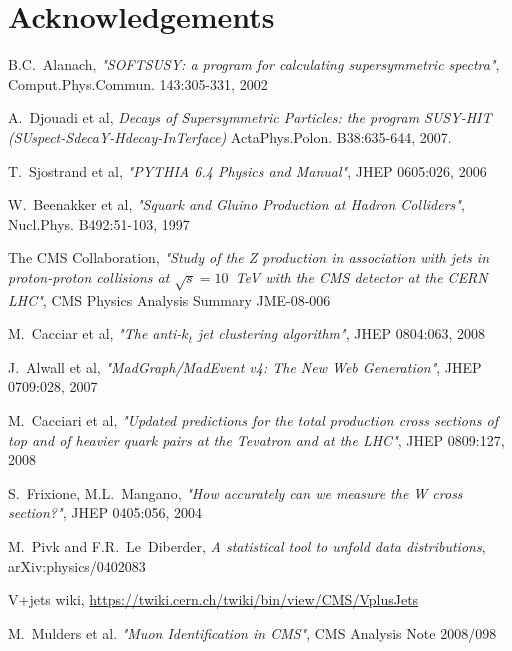 \documentclass{cmspaper}
\begin{document}
\section{Acknowledgements}

\begin{thebibliography}{9}
     B.C.~Alanach, {\em "SOFTSUSY: a program for calculating supersymmetric spectra"}, Comput.Phys.Commun. 143:305-331, 2002
    
     A.~Djouadi et al, {\em Decays of Supersymmetric Particles: the program SUSY-HIT (SUspect-SdecaY-Hdecay-InTerface)} ActaPhys.Polon. B38:635-644, 2007.

     T.~Sjostrand et al, {\em "PYTHIA 6.4 Physics and Manual"}, JHEP 0605:026, 2006

     W.~Beenakker et al, {\em "Squark and Gluino Production at Hadron Colliders"}, Nucl.Phys. B492:51-103, 1997
    
     The CMS Collaboration, {\em "Study of the Z production in association with jets in proton-proton collisions at $\sqrt{s}=10$~TeV with the CMS detector at the CERN LHC"}, CMS Physics Analysis Summary JME-08-006

    

     M.~Cacciar et al, {\em "The anti-$k_t$ jet clustering algorithm"}, JHEP 0804:063, 2008

     J.~Alwall et al, {\em "MadGraph/MadEvent v4: The New Web Generation"}, JHEP 0709:028, 2007
    
     M.~Cacciari et al, {\em "Updated predictions for the total production cross sections of top and of heavier quark pairs at the Tevatron and at the LHC"}, JHEP 0809:127, 2008
    
     S.~Frixione, M.L.~Mangano, {\em "How accurately can we measure the W cross section?"}, JHEP 0405:056, 2004
    
     M.~Pivk and F.R.~Le~Diberder, {\em A statistical tool to unfold data distributions}, arXiv:physics/0402083    

     V+jets wiki, \url{https://twiki.cern.ch/twiki/bin/view/CMS/VplusJets}

     M.~Mulders et al. {\em "Muon Identification in CMS"}, CMS Analysis Note 2008/098
    

\end{thebibliography}
\end{document}
